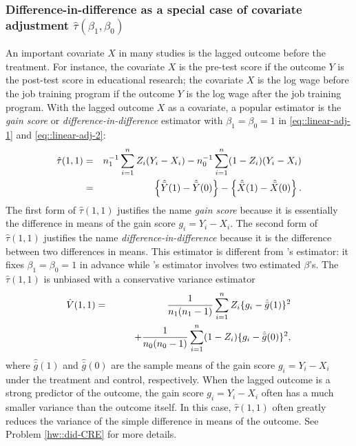 \subsubsection{Difference-in-difference as a special case of covariate adjustment $\hat \tau(\beta_1, \beta_0)$}\label{sec::difference-in-difference-CRE}
An important covariate $X$ in many studies is the lagged outcome before the treatment. For instance, the covariate $X$ is the pre-test score if the outcome $Y$ is the post-test score in educational research; the covariate $X$ is the log wage before the job training program if the outcome $Y$ is the log wage after the job training program. With the lagged outcome $X$ as a covariate, a popular estimator is the {\it gain score} or {\it difference-in-difference} estimator with $\beta_1 = \beta_0=1$ in \eqref{eq::linear-adj-1} and \eqref{eq::linear-adj-2}: 
\begin{eqnarray*}
\hat{\tau}(1,1) &=& n_1^{-1} \sum_{i=1}^n Z_i(Y_i -   X_i) - n_0^{-1} \sum_{i=1}^n (1-Z_i) (Y_i -   X_i) \\
&=& \left\{   \hat{\bar{Y}}(1) - \hat{\bar{Y}}(0) \right\} -  \left\{   \hat{\bar{X} }(1) - \hat{\bar{X} }(0) \right\} .
\end{eqnarray*}
The first form of $\hat{\tau}(1,1) $ justifies the name {\it gain score} because it is essentially the difference in means of the gain score $g_i = Y_i - X_i$. 
The second form of $\hat{\tau}(1,1) $ justifies the name {\it difference-in-difference} because it is the difference between two differences in means. 
This estimator is different from \citet{lin2013}'s estimator: it fixes $\beta_1 = \beta_0=1$ in advance while \citet{lin2013}'s estimator involves two estimated $\beta$'s. The $\hat{\tau}(1,1) $ is unbiased
with a conservative variance estimator
\begin{eqnarray*}
\hat{V}( 1,1 ) 
&=& \frac{1}{n_1(n_1 - 1)} \sum_{i=1}^n Z_i  \{ g_i - \hat{\bar{g}}(1)   \}^2 \\
& & \qquad + \frac{1}{n_0(n_0 - 1)} \sum_{i=1}^n (1-Z_i)  \{ g_i - \hat{\bar{g}}(0)   \}^2,
\end{eqnarray*}
where $\hat{\bar{g}}(1)$ and $ \hat{\bar{g}}(0)$ are the sample means of the gain score $g_i = Y_i - X_i$ under the treatment and control, respectively. 
When the lagged outcome is a strong predictor of the outcome, the gain score $g_i = Y_i - X_i$ often has a much smaller variance than the outcome itself. In this case, $\hat{\tau}(1,1) $ often greatly reduces the variance of the simple difference in means of the outcome. 
See Problem \ref{hw::did-CRE} for more details. 


